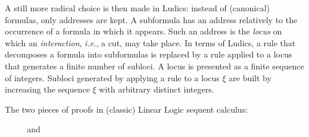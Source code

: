 \documentclass{LMCS}
\def\ie{{\em i.e.}}
\begin{document}
A still more radical choice is then made in Ludics: instead of (canonical) formulas, only addresses are kept. A subformula has an address relatively to the occurrence of a formula in which it appears. Such an address is the {\em locus} on which an {\em interaction}, \ie, a cut, may take place. In terms of Ludics, a rule that decomposes a formula into subformulas is replaced by a rule applied to a locus that generates a finite number of subloci. 
A locus is presented as a finite sequence of integers. Subloci generated by applying a rule to a locus $\xi$ are built by increasing the sequence $\xi$ with arbitrary distinct integers. 

\begin{exa}
The two pieces of proofs in (classic) Linear Logic sequent calculus:\\
\begin{center}
$\quad$        
                     $\quad$ and $\quad$
\end{center}


\end{exa}
\end{document}
